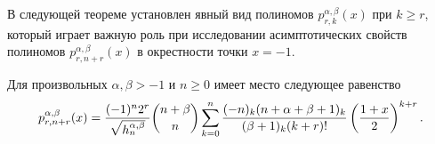 В следующей теореме установлен явный вид полиномов $p_{r,k}^{\alpha,\beta}(x)$ при $k\ge r$, который играет  важную роль при исследовании асимптотических свойств полиномов $p_{r,n+r}^{\alpha,\beta}(x)$ в окрестности точки $x=-1$.



\begin{theorem} Для произвольных $\alpha, \beta>-1$ и $n\ge0$
имеет место следующее равенство
\begin{equation}\label{4.4}
p_{r,n+r}^{\alpha,\beta}(x)=\frac{(-1)^n2^{r}}{\sqrt{ h_n^{\alpha,\beta}}}
{n+\beta\choose n}
\sum_{k=0}^n{(-n)_k(n+\alpha+\beta+1)_k\over (\beta+1)_k(k+r)!}
\left({1+x\over 2}\right)^{k+r}.
\end{equation}
\end{theorem}

